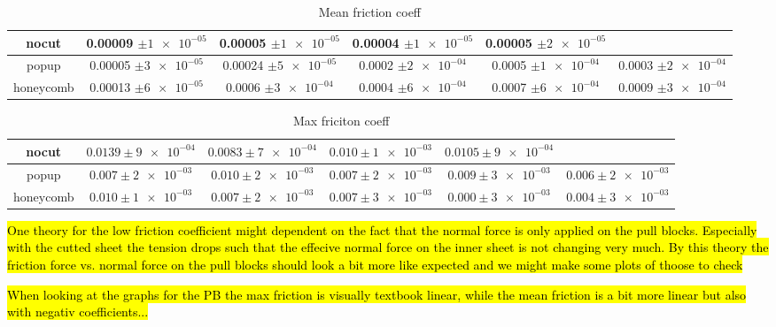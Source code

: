 \begin{table}[H]
  \begin{center}
  \caption{Mean friction coeff}
  \label{tab:fric_coeff}
  \begin{tabular}{| c | c | c | c | c | c |} \hline
    nocut & 0.00009 $\pm\num{1e-05}$ & 0.00005 $\pm\num{1e-05}$ & 0.00004 $\pm\num{1e-05}$ & 0.00005 $\pm\num{2e-05}$ & \\ \hline
    popup & 0.00005 $\pm\num{3e-05}$ & 0.00024 $\pm\num{5e-05}$ & 0.0002 $\pm\num{2e-04}$ & 0.0005 $\pm\num{1e-04}$ & 0.0003 $\pm\num{2e-04}$ \\ \hline
    honeycomb & 0.00013 $\pm\num{6e-05}$ & 0.0006 $\pm\num{3e-04}$ & 0.0004 $\pm\num{6e-04}$ & 0.0007 $\pm\num{6e-04}$ & 0.0009 $\pm\num{3e-04}$ \\ \hline
  \end{tabular}
  \end{center}
\end{table}

\begin{table}[H]
  \begin{center}
  \caption{Max friciton coeff}
  \label{tab:fric_coeff}
  \begin{tabular}{| c | c | c | c | c | c |} \hline
    nocut & $0.0139 \pm \num{9e-04}$& $0.0083 \pm \num{7e-04}$& $0.010 \pm \num{1e-03}$& $0.0105 \pm \num{9e-04}$ &  \\ \hline
    popup & $0.007 \pm \num{2e-03}$& $0.010 \pm \num{2e-03}$& $0.007 \pm \num{2e-03}$& $0.009 \pm \num{3e-03}$& $0.006 \pm \num{2e-03}$ \\ \hline
    honeycomb & $0.010 \pm \num{1e-03}$& $0.007 \pm \num{2e-03}$& $0.007 \pm \num{3e-03}$& $0.000 \pm \num{3e-03}$& $0.004 \pm \num{3e-03}$ \\ \hline
  \end{tabular}
  \end{center}
\end{table}


\hl{One theory for the low friction coefficient might dependent on the fact that the normal force is only applied on the pull blocks. Especially with the cutted sheet the tension drops such that the effecive normal force on the inner sheet is not changing very much. By this theory the friction force vs. normal force on the pull blocks should look a bit more like expected and we might make some plots of thoose to check}

\hl{When looking at the graphs for the PB the max friction is visually textbook linear, while the mean friction is a bit more linear but also with negativ coefficients...}



